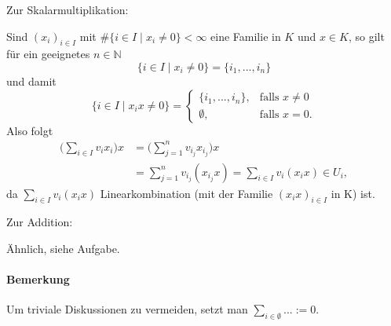  		Zur Skalarmultiplikation:
 		\begin{addmargin}[25pt]{0pt}
 			Sind $(x_i)_{i\in I}$ mit $\#\{i\in I \mid x_i \neq 0\}<\infty$ eine Familie in $ K $ und $x\in K$, so gilt für ein geeignetes $n\in \mathbb{N}$
 			\[
 				\{i\in I\mid x_i \neq 0\} = \{i_1, ... , i_n\}
 			\]
 			und damit
 			\begin{equation*}
 				\{i\in I\mid x_ix\neq 0\} =
 				\begin{cases}
 					\{{i_1,...,i_n\}}, & \text{falls }x \neq 0 \\
 					\emptyset,         & \text{falls }x = 0.
 				\end{cases}
 			\end{equation*}
 			Also folgt
 			\begin{align*}
 				\bigg(\sum_{i\in I}v_i x_i\bigg) x & = \bigg(\sum_{j=1}^{n} v_{i_j}x_{i_j}\bigg)x                          \\
 				                                   & = \sum_{j=1}^{n} v_{i_j}(x_{i_j}x) = \sum_{i\in I} v_i(x_ix) \in U_i,
 			\end{align*}
 			da $\sum_{i\in I} v_i(x_ix)$ Linearkombination (mit der Familie $(x_ix)_{i\in I}$ in K) ist.
 		\end{addmargin}

 		Zur Addition:
 		\begin{addmargin}[25pt]{0pt}
 			Ähnlich, siehe Aufgabe.
 		\end{addmargin}

 	\paragraph{Bemerkung}
 		Um triviale Diskussionen zu vermeiden, setzt man $\sum_{i\in \emptyset} ...:=0$.
